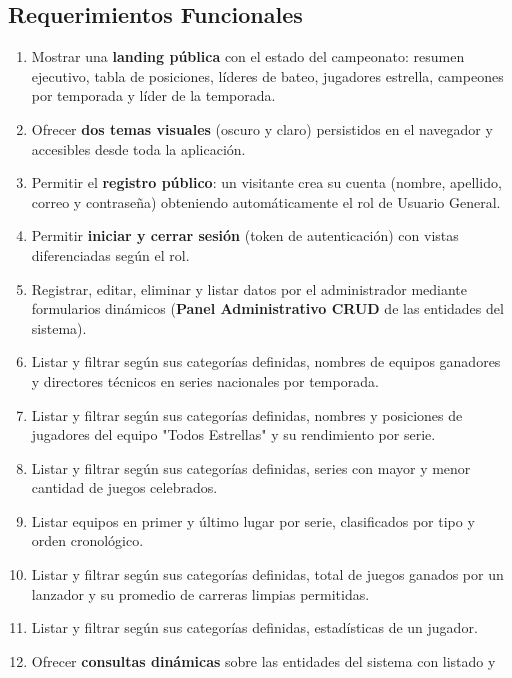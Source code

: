 \documentclass{report}
\begin{document}
        \subsection*{Requerimientos Funcionales}
            \begin{enumerate}
                \item Mostrar una \textbf{landing pública} con el estado del campeonato: resumen ejecutivo,
                tabla de posiciones, líderes de bateo, jugadores estrella, campeones por temporada y líder
                de la temporada.
                \item Ofrecer \textbf{dos temas visuales} (oscuro y claro) persistidos en el navegador y
                accesibles desde toda la aplicación.
                \item Permitir el \textbf{registro público}: un visitante crea su cuenta (nombre, apellido,
                correo y contraseña) obteniendo automáticamente el rol de Usuario General.
                \item Permitir \textbf{iniciar y cerrar sesión} (token de autenticación) con vistas
                diferenciadas según el rol.
                \item Registrar, editar, eliminar y listar datos por el administrador mediante formularios
                dinámicos (\textbf{Panel Administrativo CRUD} de las entidades del sistema).
                \item Listar y filtrar según sus categorías definidas, nombres de equipos ganadores y
                directores técnicos en series nacionales por temporada.
                \item Listar y filtrar según sus categorías definidas, nombres y posiciones de jugadores del
                equipo "Todos Estrellas" y su rendimiento por serie.
                \item Listar y filtrar según sus categorías definidas, series con mayor y menor cantidad de
                juegos celebrados.
                \item Listar equipos en primer y último lugar por serie, clasificados por tipo y orden
                cronológico.
                \item Listar y filtrar según sus categorías definidas, total de juegos ganados por un
                lanzador y su promedio de carreras limpias permitidas.
                \item Listar y filtrar según sus categorías definidas, estadísticas de un jugador.
                \item Ofrecer \textbf{consultas dinámicas} sobre las entidades del sistema con listado y

\end{enumerate}
\end{document}
